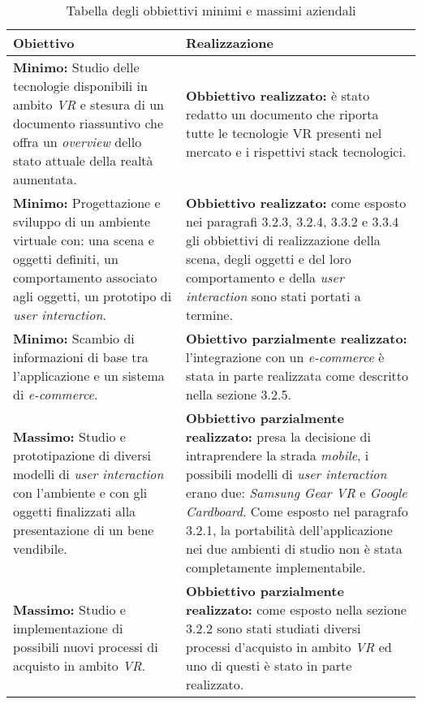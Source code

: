 \begin{table}
	\centering
	\label{tabella-obbiettivi}
	\begin{tabular}{| p{6cm} | p{6cm} |}
		\hline
		\textbf{Obiettivo} & \textbf{Realizzazione} \\ \hline
		 \textbf{Minimo:} Studio delle tecnologie disponibili in ambito \textit{VR}\ped{\hyperlink{vr}{G}} e stesura di un documento riassuntivo che offra un \textit{overview} dello stato attuale della realtà aumentata. &  \textbf{Obbiettivo realizzato:} è stato redatto un documento che riporta tutte le tecnologie VR presenti nel mercato e i rispettivi stack tecnologici.\\ \hline
		 \textbf{Minimo:} Progettazione e sviluppo di un ambiente virtuale con: una scena e oggetti definiti, un comportamento associato agli oggetti, un prototipo di \textit{user interaction}. & \textbf{Obbiettivo realizzato:} come esposto nei paragrafi 3.2.3, 3.2.4, 3.3.2 e 3.3.4 gli obbiettivi di realizzazione della scena, degli oggetti e del loro comportamento e della \textit{user interaction} sono stati portati a termine. \\ \hline
		 \textbf{Minimo:} Scambio di informazioni di base tra l'applicazione e un sistema di \textit{e-commerce}. & \textbf{Obiettivo parzialmente realizzato:} l'integrazione con un \textit{e-commerce} è stata in parte realizzata come descritto nella sezione 3.2.5.\\ \hline
		 \textbf{Massimo:} Studio e prototipazione di diversi modelli di \textit{user interaction} con l'ambiente e con gli oggetti finalizzati alla presentazione di un bene vendibile. & \textbf{Obbiettivo parzialmente realizzato:} presa la decisione di intraprendere la strada \textit{mobile}, i possibili modelli di \textit{user interaction} erano due: \textit{Samsung Gear VR} e \textit{Google Cardboard}. Come esposto nel paragrafo 3.2.1, la portabilità dell'applicazione nei due ambienti di studio non è stata completamente implementabile.\\ \hline
		 \textbf{Massimo:} Studio e implementazione di possibili nuovi processi di acquisto in ambito \textit{VR}\ped{\hyperlink{vr}{G}}. & \textbf{Obbiettivo parzialmente realizzato:} come esposto nella sezione 3.2.2 sono stati studiati diversi processi d'acquisto in ambito \textit{VR}\ped{\hyperlink{vr}{G}} ed uno di questi è stato in parte realizzato.\\ \hline
	\end{tabular}
	\caption{Tabella degli obbiettivi minimi e massimi aziendali}
\end{table}
\FloatBarrier


